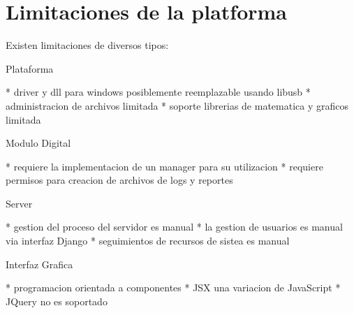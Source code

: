 \section{Limitaciones de la platforma}


Existen limitaciones de diversos tipos:


Plataforma

* driver y dll para windows posiblemente reemplazable usando libusb
* administracion de archivos limitada
* soporte librerias de matematica y graficos limitada

Modulo Digital

* requiere la implementacion de un manager para su utilizacion
* requiere permisos para creacion de archivos de logs y reportes

Server

* gestion del proceso del servidor es manual
* la gestion de usuarios es manual via interfaz Django
* seguimientos de recursos de sistea es manual


Interfaz Grafica

* programacion orientada a componentes
* JSX una variacion de JavaScript
* JQuery no es soportado

\newpage
